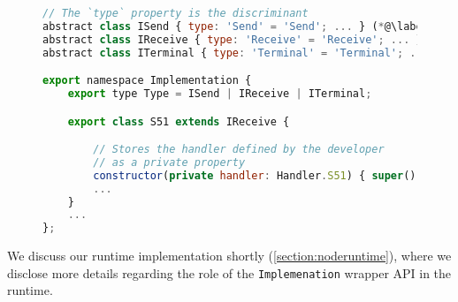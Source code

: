 \begin{figure}[!h]
\begin{lstlisting}[language=javascript,tabsize=2]
// The `type` property is the discriminant
abstract class ISend { type: 'Send' = 'Send'; ... } (*@\label{line:nodeefsmsend}@*)
abstract class IReceive { type: 'Receive' = 'Receive'; ... } (*@\label{line:nodeefsmreceive}@*)
abstract class ITerminal { type: 'Terminal' = 'Terminal'; ... } (*@\label{line:nodeefsmterminal}@*)

export namespace Implementation {
	export type Type = ISend | IReceive | ITerminal;

	export class S51 extends IReceive {

		// Stores the handler defined by the developer
		// as a private property	
		constructor(private handler: Handler.S51) { super(); }
		...
	}
	...	
};
\end{lstlisting}
\label{lst:nodeefsmimplementation}
\end{figure}

We discuss our runtime implementation shortly 
(\cref{section:noderuntime}), where we disclose more details regarding
the role of the \texttt{Implemenation} wrapper API in
the runtime.